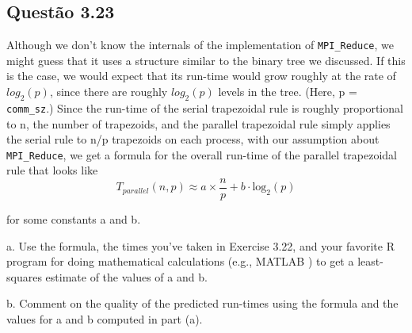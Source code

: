 

\subsection{Questão 3.23}

Although we don’t know the internals of the implementation of \texttt{MPI\_Reduce}, we might guess that it uses a structure similar to the binary tree we discussed. If this is the case, we would expect that its run-time would grow roughly at the rate of  $log_{2}(p)$, since there are roughly $log_{2}(p)$ levels in the tree. (Here, p = \texttt{comm\_sz}.) Since the run-time of the serial trapezoidal rule is roughly proportional to n, the number of trapezoids, and the parallel trapezoidal rule simply applies the serial rule to n/p trapezoids on each process, with our assumption about \texttt{MPI\_Reduce}, we get a formula for the overall run-time of the parallel trapezoidal rule that looks like
\begin{equation*}
T_{parallel}(n, p) \approx a \times \frac{n}{p} + b \cdot \mathrm{log}_{2}(p)
\end{equation*}

for some constants a and b.

a. Use the formula, the times you’ve taken in Exercise 3.22, and your favorite R program for doing mathematical calculations (e.g., MATLAB ) to get a least-squares estimate of the values of a and b.

b. Comment on the quality of the predicted run-times using the formula and the values for a and b computed in part (a).\\

